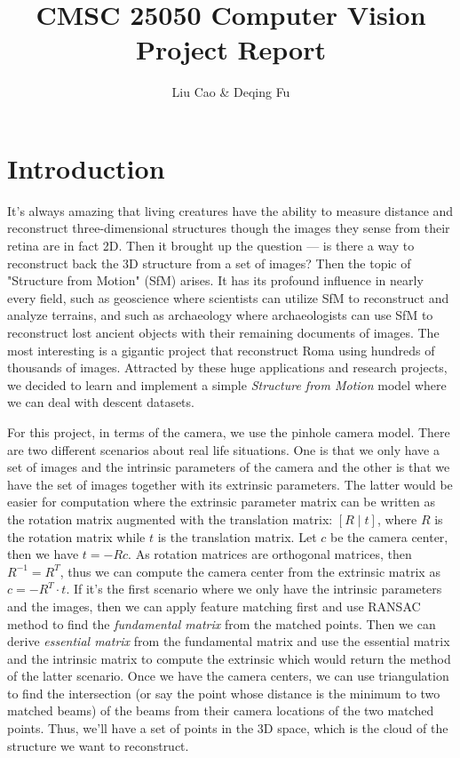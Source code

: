 \documentclass[10pt]{article}
\title{CMSC 25050 Computer Vision Project Report}
\author{Liu Cao \& Deqing Fu}
\date{}
\begin{document}
\maketitle
\section*{Introduction}
 It's always amazing that living creatures have the ability to measure distance and reconstruct three-dimensional structures though the images they sense from their retina are in fact 2D. Then it brought up the question --- is there a way to reconstruct back the 3D structure from a set of images? Then the topic of "Structure from Motion" (SfM) arises. It has its profound influence in nearly every field, such as geoscience where scientists can utilize SfM to reconstruct and analyze terrains, and such as archaeology where archaeologists can use SfM to reconstruct lost ancient objects with their remaining documents of images. The most interesting is a gigantic project that reconstruct Roma using hundreds of thousands of images. Attracted by these huge applications and research projects, we decided to learn and implement a simple \emph{Structure from Motion} model where we can deal with descent datasets. 

For this project, in terms of the camera, we use the pinhole camera model. There are two different scenarios about real life situations. One is that we only have a set of images and the intrinsic parameters of the camera and the other is that we have the set of images together with its extrinsic parameters. The latter would be easier for computation where the extrinsic parameter matrix can be written as the rotation matrix augmented with the translation matrix: $[R \mid t]$, where $R$ is the rotation matrix while $t$ is the translation matrix. Let $c$ be the camera center, then we have $t = -Rc$. As rotation matrices are orthogonal matrices, then $R^{-1} = R^T$, thus we can compute the camera center from the extrinsic matrix as $c = - R^T \cdot t$. If it's the first scenario where we only have the intrinsic parameters and the images, then we can apply feature matching first and use RANSAC method to find the \emph{fundamental matrix} from the matched points. Then we can derive \emph{essential matrix} from the fundamental matrix and use the essential matrix  and the intrinsic matrix to compute the extrinsic which would return the method of the latter scenario. Once we have the camera centers, we can use triangulation to find the intersection (or say the point whose distance is the minimum to two matched beams) of the beams from their camera locations of the two matched points. Thus, we'll have a set of points in the 3D space, which is the cloud of the structure we want to reconstruct. 
\end{document}
